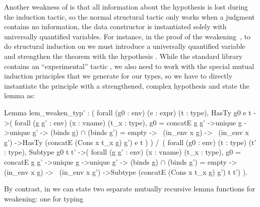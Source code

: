 Another weakness of \coq is that all 
information about the hypothesis is lost during the induction
tactic, so the normal structural  tactic only works when
a judgment contains no information, \ie the data constructor
is instantiated solely with universally quantified
variables. 
%
For instance, in the proof of the weakening~,
to do structural induction on %
we must introduce a universally quantified variable 
and strengthen the theorem with the hypothesis
.
%
While the standard library contains an ``experimental'' tactic 
, we also need to work with 
the special mutual induction principles that we generate for
our types, so we have to directly instantiate the principle
with a strengthened, complex hypothesis%
and state the lemma as:
\begin{mcode}
  Lemma lem_weaken_typ' : ( forall (g0 : env) (e : expr) (t : type),
    HasTy g0 e t ->( forall (g g' : env) (x : vname) (t_x : type),
       g0 = concatE g g' ->unique g ->unique g' ->
       (binds g) $\cap $ (binds g') = empty ->~ (in_env x g) ->~ (in_env x g')
       ->HasTy (concatE (Cons x t_x g) g') e t ) ) /\ (
  forall (g0 : env) (t : type) (t' : type),
    Subtype g0 t t' ->( forall (g g' : env) (x : vname) (t_x : type),
       g0 = concatE g g' ->unique g ->unique g' -> 
       (binds g) $\cap $ (binds g') = empty ->~ (in_env x g) ->~ (in_env x g')
       ->Subtype (concatE (Cons x t_x g) g') t t') ).
\end{mcode}
%
By contrast, in \lh we can state two separate mutually recursive
lemma functions for weakening: one for typing
